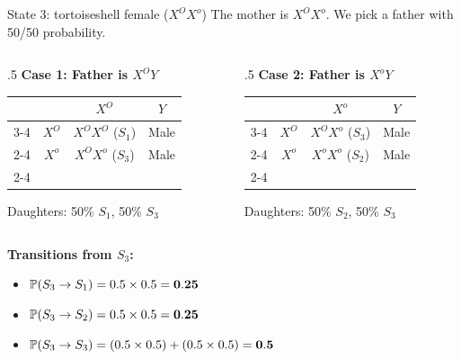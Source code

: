 \documentclass[aspectratio=169]{beamer}\usepackage[]{graphicx}\usepackage[]{xcolor}
\begin{document}
\begin{frame}{State 3: tortoiseshell female ($X^O X^o$)}
    The mother is $X^O X^o$. We pick a father with 50/50 probability.
    
    \begin{columns}[T]
        \begin{column}{.5\textwidth}
            \centering
            \textbf{Case 1: Father is $X^O Y$}
            \renewcommand{\arraystretch}{1.5}
            \begin{tabular}{c c | c | c |}
            \multicolumn{2}{c}{} & \multicolumn{1}{c}{$X^O$} & \multicolumn{1}{c}{$Y$} \\ \cline{3-4}
            \multirow{2}{*}{\rotatebox{90}{Mother}} & $X^O$ & \cellcolor{punnettorange}$X^O X^O$ ($S_1$) & \cellcolor{punnettorange}Male \\ \cline{2-4}
            & $X^o$ & \cellcolor{punnetttortie}$X^O X^o$ ($S_3$) & \cellcolor{punnettblack}Male \\ \cline{2-4}
            \end{tabular}
            \vspace{1em}
            
            Daughters: 50\% $S_1$, 50\% $S_3$
        \end{column}
        \begin{column}{.5\textwidth}
            \centering
            \textbf{Case 2: Father is $X^o Y$}
            \renewcommand{\arraystretch}{1.5}
            \begin{tabular}{c c | c | c |}
            \multicolumn{2}{c}{} & \multicolumn{1}{c}{$X^o$} & \multicolumn{1}{c}{$Y$} \\ \cline{3-4}
            \multirow{2}{*}{\rotatebox{90}{Mother}} & $X^O$ & \cellcolor{punnetttortie}$X^O X^o$ ($S_3$) & \cellcolor{punnettorange}Male \\ \cline{2-4}
            & $X^o$ & \cellcolor{punnettblack}$X^o X^o$ ($S_2$) & \cellcolor{punnettblack}Male \\ \cline{2-4}
            \end{tabular}
            \vspace{1em}
            
            Daughters: 50\% $S_2$, 50\% $S_3$
        \end{column}
    \end{columns}
    
    \vfill
    \textbf{Transitions from $S_3$:}
    \begin{itemize}
        \item $\mathbb{P}(S_3 \to S_1) = 0.5 \times 0.5 = \mathbf{0.25}$
        \item $\mathbb{P}(S_3 \to S_2) = 0.5 \times 0.5 = \mathbf{0.25}$
        \item $\mathbb{P}(S_3 \to S_3) = (0.5 \times 0.5) + (0.5 \times 0.5) = \mathbf{0.5}$
    \end{itemize}
\end{frame}
\end{document}
